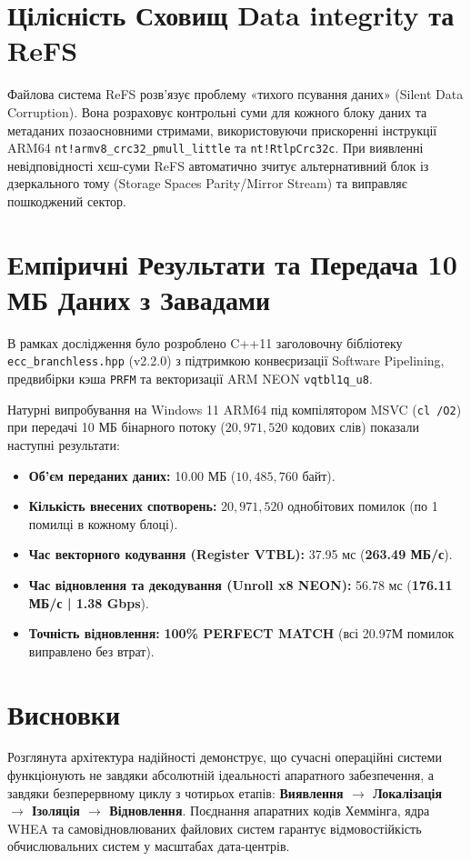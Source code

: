 \documentclass[12pt,a4paper]{article}
\begin{document}
\section{Цілісність Сховищ Data integrity та ReFS}
Файлова система ReFS розв'язує проблему «тихого псування даних» (Silent Data Corruption). Вона розраховує контрольні суми для кожного блоку даних та метаданих позаосновними стримами, використовуючи прискоренні інструкції ARM64 \texttt{nt!armv8\_crc32\_pmull\_little} та \texttt{nt!RtlpCrc32c}. При виявленні невідповідності хєш-суми ReFS автоматично зчитує альтернативний блок із дзеркального тому (Storage Spaces Parity/Mirror Stream) та виправляє пошкоджений сектор.

\section{Емпіричні Результати та Передача 10 МБ Даних з Завадами}
В рамках дослідження було розроблено C++11 заголовочну бібліотеку \texttt{ecc\_branchless.hpp} (v2.2.0) з підтримкою конвеєризації Software Pipelining, предвибірки кэша \texttt{PRFM} та векторизації ARM NEON \texttt{vqtbl1q\_u8}.

Натурні випробування на Windows 11 ARM64 під компілятором MSVC (\texttt{cl /O2}) при передачі 10 МБ бінарного потоку ($20,971,520$ кодових слів) показали наступні результати:

\begin{itemize}
    \item \textbf{Об'єм переданих даних:} 10.00 МБ ($10,485,760$ байт).
    \item \textbf{Кількість внесених спотворень:} $20,971,520$ однобітових помилок (по 1 помилці в кожному блоці).
    \item \textbf{Час векторного кодування (Register VTBL):} 37.95 мс (\textbf{263.49 МБ/с}).
    \item \textbf{Час відновлення та декодування (Unroll x8 NEON):} 56.78 мс (\textbf{176.11 МБ/с | 1.38 Gbps}).
    \item \textbf{Точність відновлення:} \textbf{100\% PERFECT MATCH} (всі 20.97М помилок виправлено без втрат).
\end{itemize}

\section{Висновки}
Розглянута архітектура надійності демонструє, що сучасні операційні системи функціонують не завдяки абсолютній ідеальності апаратного забезпечення, а завдяки безперервному циклу з чотирьох етапів: \textbf{Виявлення $\rightarrow$ Локалізація $\rightarrow$ Ізоляція $\rightarrow$ Відновлення}. Поєднання апаратних кодів Хеммінга, ядра WHEA та самовідновлюваних файлових систем гарантує відмовостійкість обчислювальних систем у масштабах дата-центрів.
\end{document}
